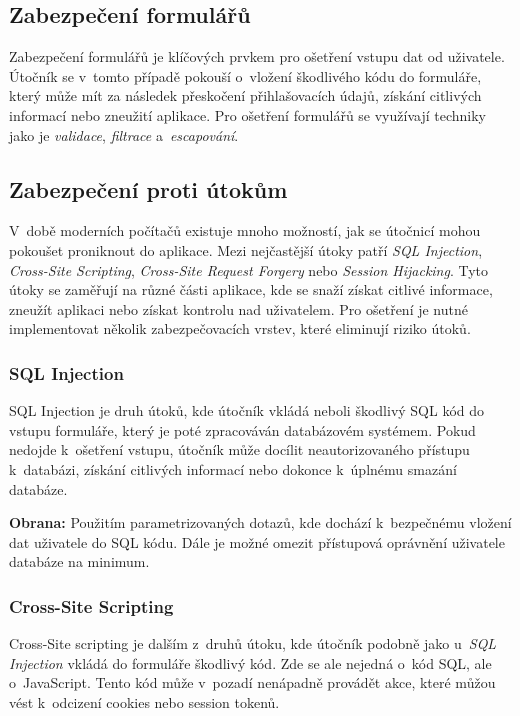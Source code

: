 \subsection{Zabezpečení formulářů}
\label{subsec:security-forms}
Zabezpečení formulářů je klíčových prvkem pro ošetření vstupu dat od uživatele. Útočník se v~tomto případě pokouší o~vložení škodlivého kódu do formuláře, který může mít za následek přeskočení přihlašovacích údajů, získání citlivých informací nebo zneužití aplikace. Pro ošetření formulářů se využívají techniky jako je \textit{validace}, \textit{filtrace} a~\textit{escapování}.

\subsection{Zabezpečení proti útokům}
\label{subsec:security-attacks}
V~době moderních počítačů existuje mnoho možností, jak se útočnicí mohou pokoušet proniknout do aplikace. Mezi nejčastější útoky patří \textit{SQL Injection}, \textit{Cross-Site Scripting}, \textit{Cross-Site Request Forgery} nebo \textit{Session Hijacking}. Tyto útoky se zaměřují na různé části aplikace, kde se snaží získat citlivé informace, zneužít aplikaci nebo získat kontrolu nad uživatelem. Pro ošetření je nutné implementovat několik zabezpečovacích vrstev, které eliminují riziko útoků.

\subsubsection*{SQL Injection}
\label{subsubsec:security-attacks-sql-injection}
SQL Injection je druh útoků, kde útočník vkládá neboli  škodlivý SQL kód do vstupu formuláře, který je poté zpracováván databázovém systémem. Pokud nedojde k~ošetření vstupu, útočník může docílit neautorizovaného přístupu k~databázi, získání citlivých informací nebo dokonce k~úplnému smazání databáze.

\textbf{Obrana:} Použitím parametrizovaných dotazů, kde dochází k~bezpečnému vložení dat uživatele do SQL kódu. Dále je možné omezit přístupová oprávnění uživatele databáze na minimum.

\subsubsection*{Cross-Site Scripting}
\label{subsubsec:security-attacks-cross-site-scripting}
Cross-Site scripting je dalším z~druhů útoku, kde útočník podobně jako u~\textit{SQL Injection} vkládá do formuláře škodlivý kód. Zde se ale nejedná o~kód SQL, ale o~JavaScript. Tento kód může v~pozadí nenápadně provádět akce, které můžou vést k~odcizení cookies nebo session tokenů.

